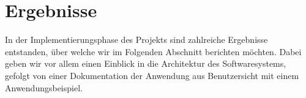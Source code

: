 \section{Ergebnisse}
\label{sec:results}

In der Implementierungsphase des Projekts sind zahlreiche Ergebnisse entstanden, über welche wir im Folgenden Abschnitt berichten möchten.
Dabei geben wir vor allem einen Einblick in die Architektur des Softwaresystems, gefolgt von einer Dokumentation der Anwendung aus Benutzersicht mit einem Anwendungsbeispiel.




